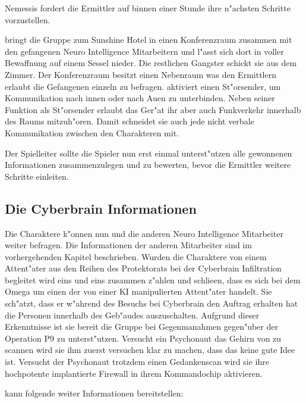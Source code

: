 Nemessis fordert die Ermittler auf binnen einer Stunde ihre n"achsten Schritte vorzustellen. 


\xl{} bringt die Gruppe zum Sunshine Hotel in einen Konferenzraum zusammen mit den gefangenen Neuro Intelligence Mitarbeitern und l"asst sich dort in voller Bewaffnung auf einem Sessel nieder. Die restlichen Gangster schickt sie aus dem Zimmer. Der Konferenzraum besitzt einen Nebenraum was den Ermittlern erlaubt die Gefangenen einzeln zu befragen. \xl{} aktiviert einen St"orsender, um Kommunikation nach innen oder nach Au\3en zu unterbinden. Neben seiner Funktion als St"orsender erlaubt das Ger"at ihr aber auch Funkverkehr innerhalb des Raums mitzuh"oren.
Damit schneidet sie auch jede nicht verbale Kommunikation zwischen den Charakteren mit.

Der Spielleiter sollte die Spieler nun erst einmal unterst"utzen alle gewonnenen Informationen zusammenzulegen und zu bewerten, bevor die Ermittler weitere Schritte einleiten. 

\subsection{Die Cyberbrain Informationen} 
Die Charaktere k"onnen nun \ml{} und die anderen Neuro Intelligence Mitarbeiter weiter befragen. Die Informationen der anderen Mitarbeiter sind im vorhergehenden Kapitel beschrieben. Wurden die Charaktere von einem Attent"ater aus den Reihen des Protektorats bei der Cyberbrain Infiltration begleitet wird \ml{} eins und eins zusammen z"ahlen und schlie\3en, dass es sich bei dem Omega um einen der von einer KI manipulierten Attent"ater handelt. Sie sch"atzt, dass er w"ahrend des Besuchs bei Cyberbrain den Auftrag erhalten hat die Personen innerhalb des Geb"audes auszuschalten. Aufgrund dieser Erkenntnisse ist sie bereit die Gruppe bei Gegenma\3nahmen gegen"uber der Operation P9 zu unterst"utzen. Versucht ein Psychonaut das Gehirn von \ml{} zu scannen wird sie ihm zuerst versuchen klar zu machen, dass das keine gute Idee ist. Versucht der Psychonaut trotzdem einen Gedankenscan wird sie ihre hochpotente implantierte Firewall in ihrem Kommandochip aktivieren.

\ml{} kann folgende weiter Informationen bereitstellen:

